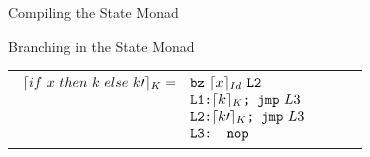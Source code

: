\documentclass{beamer}
\begin{document}
\begin{frame}{Compiling the State Monad}
\begin{itemize}
\end{itemize}

\begin{structure}{Branching in the State Monad}
\begin{center}

\begin{onlinebox}{9cm}


\begin{tabular}[t]{llll}
$
\begin{array}[t]{llll}

\lceil if\ x\ then\ k\ else\ k\prime\rceil_K =& \texttt{bz}\ \lceil x \rceil_{Id}\ \texttt{L2}\\
&\texttt{L1:} \lceil k \rceil_K\texttt{; jmp}\ L3\\
&\texttt{L2:} \lceil k\prime \rceil_K\texttt{; jmp}\ L3\\
&\texttt{L3: nop}\\

\end{array}
$
\end{tabular}


\end{onlinebox}
\end{center}

\end{structure}

\end{frame}
\end{document}

